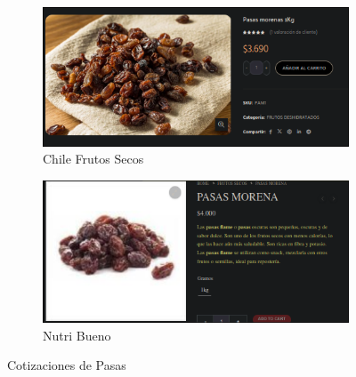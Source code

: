 \documentclass[12pt]{article}
\begin{document}
    \begin{figure}[H]
        \centering
        \begin{subfigure}{0.48\textwidth}
            \centering
            \includegraphics[width=\linewidth]{chile} %
            \caption{Chile Frutos Secos}
            \label{fig:chile_frutos_secos_pasas}
        \end{subfigure}
        \hfill
        \begin{subfigure}{0.48\textwidth}
            \centering
            \includegraphics[width=\linewidth]{nutri} %
            \caption{Nutri Bueno}
            \label{fig:nutri_bueno_pasas}
        \end{subfigure}
        \caption{Cotizaciones de Pasas}
        \label{fig:cotizaciones_pasas}
    \end{figure}
\newpage
\end{document}
